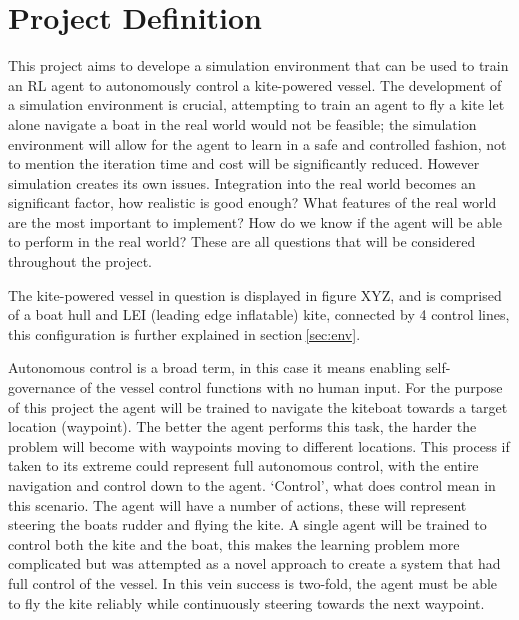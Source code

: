 

\section{Project Definition}
This project aims to develope a simulation environment that can be used to train an RL agent to autonomously control a kite-powered vessel. The development of a simulation environment is crucial, attempting to train an agent to fly a kite let alone navigate a boat in the real world would not be feasible; the simulation environment will allow for the agent to learn in a safe and controlled fashion, not to mention the iteration time and cost will be significantly reduced. However simulation creates its own issues. Integration into the real world becomes an significant factor, how realistic is good enough? What features of the real world are the most important to implement? How do we know if the agent will be able to perform in the real world? These are all questions that will be considered throughout the project. 

The kite-powered vessel in question is displayed in figure XYZ, and is comprised of a boat hull and LEI (leading edge inflatable) kite, connected by 4 control lines, this configuration is further explained in section$~$\ref{sec:env}. 

Autonomous control is a broad term, in this case it means enabling self-governance of the vessel control functions with no human input. For the purpose of this project the agent will be trained to navigate the kiteboat towards a target location (waypoint). The better the agent performs this task, the harder the problem will become with waypoints moving to different locations. This process if taken to its extreme could represent full autonomous control, with the entire navigation and control down to the agent. `Control', what does control mean in this scenario. The agent will have a number of actions, these will represent steering the boats rudder and flying the kite. A single agent will be trained to control both the kite and the boat, this makes the learning problem more complicated but was attempted as a novel approach to create a system that had full control of the vessel. In this vein success is two-fold, the agent must be able to fly the kite reliably while continuously steering towards the next waypoint.

